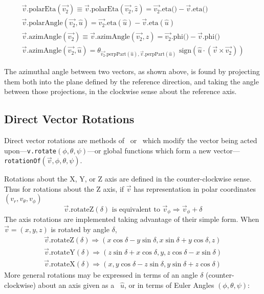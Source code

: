 \begin{eqnarray}
    \label{eq:polarA} \\
  \vec{v}\mbox{.polarEta} (\vec{v_2})
    \equiv \vec{v}\mbox{.polarEta} (\vec{v_2}, \hat{z}) =
    \vec{v_2}\mbox{.eta()} - \vec{v}\mbox{.eta()}
    \label{eq:polarEta} \\
  \vec{v}\mbox{.polarAngle} (\vec{v_2}, \hat{u}) =
    \vec{v_2}\mbox{.eta}(\hat{u}) - \vec{v}\mbox{.eta}(\hat{u})
    \label{eq:polarA:2} \\
  \vec{v}\mbox{.azimAngle} (\vec{v_2})
    \equiv \vec{v}\mbox{.azimAngle} (\vec{v_2}, \hat{z}) =
    \vec{v_2}\mbox{.phi()} - \vec{v}\mbox{.phi()}
    \label{eq:azim} \\
  \vec{v}\mbox{.azimAngle} (\vec{v_2}, \hat{u}) =
    \theta_{\vec{v_2}\mbox{.perpPart}(\hat{u}),
    \vec{v}\mbox{.perpPart}(\hat{u})}
    \mbox{ sign} \left( \hat{u} \cdot (\vec{v} \times \vec{v_2}) \right)
    \label{eq:azim:2}
\end{eqnarray}

\noindent
The azimuthal angle between two vectors, as shown above, is found by
projecting them both into the plane defined by the reference direction,
and taking the angle between those projections, in the clockwise sense about
the reference axis.

\subsection{Direct Vector Rotations}
\label{rotations}

Direct vector rotations are methods of \SV\ or \LV\ which
modify the vector being acted
upon---{\tt v.rotate}$(\phi, \theta, \psi)$---or
global functions which form a new
vector---{\tt rotationOf}$(\vec{v}, \phi, \theta, \psi)$.

\noindent
Rotations about the X, Y, or Z axis are defined in the counter-clockwise
sense.  Thus for rotations about the Z axis, if $\vec{v}$ has representation
in polar coordinates $( v_r, v_\theta, v_\phi )$
\begin{equation}
  \vec{v}.\mbox{rotateZ} ( \delta ) \mbox{ is equivalent to }
  \vec{v}_\phi \Longrightarrow \vec{v}_\phi + \delta
    \label{eq:rotZ:2}
\end{equation}
\noindent
The axis rotations are implemented taking advantage of their
simple form.  When $\vec{v} = (x, y, z)$ is rotated by angle $\delta$,
\begin{eqnarray}
  \vec{v}.\mbox{rotateZ} (\delta) \Longrightarrow
    ( x \cos\delta - y \sin\delta, x \sin\delta + y \cos\delta, z )
    \label{eq:rotZ} \\
  \vec{v}.\mbox{rotateY} (\delta) \Longrightarrow
    ( z \sin\delta + x \cos\delta, y, z \cos\delta - x \sin\delta )
    \label{eq:rotY} \\
  \vec{v}.\mbox{rotateX} (\delta) \Longrightarrow
    ( x, y \cos\delta - z \sin\delta, y \sin\delta + z \cos\delta )
    \label{eq:rotX}
\end{eqnarray}
\noindent
More general rotations may be expressed in terms of
an angle $\delta$ (counter-clockwise) about an axis given
as a \UV\ $\hat{u}$, or in terms of Euler Angles
$(\phi, \theta, \psi)$:

